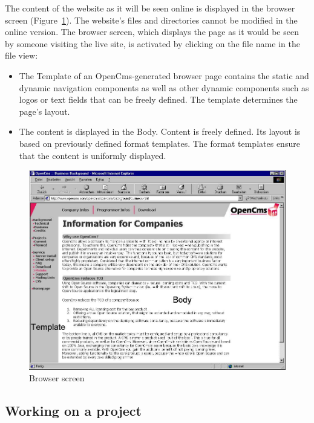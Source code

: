 The content of the website as it will be seen online is displayed
in the browser screen (Figure~\ref{browserscreen}). The website's
files and directories cannot be modified in the online version.
The browser screen, which displays the page as it would be seen by
someone visiting the live site, is activated by clicking on the
file name in the file view:

\begin{itemize}
\item The Template of an OpenCms-generated browser page contains the
static and dynamic navigation components as well as other dynamic
components such as logos or text fields that can be freely
defined. The template determines the page's layout.
\item The content is displayed in the Body. Content is freely defined. Its
layout is based on previously defined format templates. The format
templates ensure that the content is uniformly displayed.
\end{itemize}

\begin{figure}[hbt]
\begin{center}
\includegraphics[width=\sgw]
                   {pics/usermanual/browserScreen}
\caption[Browser screen]
           {Browser screen}
\label{browserscreen}
\end{center}
\end{figure}

\subsection{Working on a project}

